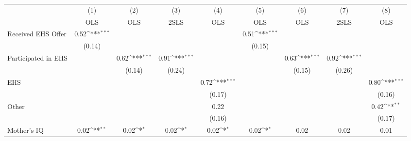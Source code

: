 {
\def\sym#1{\ifmmode^{#1}\else\(^{#1}\)\fi}
\begin{tabular}{l*{8}{c}}
\hline\hline
                    &\multicolumn{1}{c}{(1)}&\multicolumn{1}{c}{(2)}&\multicolumn{1}{c}{(3)}&\multicolumn{1}{c}{(4)}&\multicolumn{1}{c}{(5)}&\multicolumn{1}{c}{(6)}&\multicolumn{1}{c}{(7)}&\multicolumn{1}{c}{(8)}\\
                    &\multicolumn{1}{c}{OLS}&\multicolumn{1}{c}{OLS}&\multicolumn{1}{c}{2SLS}&\multicolumn{1}{c}{OLS}&\multicolumn{1}{c}{OLS}&\multicolumn{1}{c}{OLS}&\multicolumn{1}{c}{2SLS}&\multicolumn{1}{c}{OLS}\\
\hline
Received EHS Offer  &        0.52\sym{***}&                     &                     &                     &        0.51\sym{***}&                     &                     &                     \\
                    &      (0.14)         &                     &                     &                     &      (0.15)         &                     &                     &                     \\
[1em]
Participated in EHS &                     &        0.62\sym{***}&        0.91\sym{***}&                     &                     &        0.63\sym{***}&        0.92\sym{***}&                     \\
                    &                     &      (0.14)         &      (0.24)         &                     &                     &      (0.15)         &      (0.26)         &                     \\
[1em]
EHS                 &                     &                     &                     &        0.72\sym{***}&                     &                     &                     &        0.80\sym{***}\\
                    &                     &                     &                     &      (0.17)         &                     &                     &                     &      (0.16)         \\
[1em]
Other               &                     &                     &                     &        0.22         &                     &                     &                     &        0.42\sym{**} \\
                    &                     &                     &                     &      (0.16)         &                     &                     &                     &      (0.17)         \\
[1em]
Mother's IQ         &        0.02\sym{**} &        0.02\sym{*}  &        0.02\sym{*}  &        0.02\sym{*}  &        0.02\sym{*}  &        0.02         &        0.02         &        0.01         \\

\end{tabular}}

